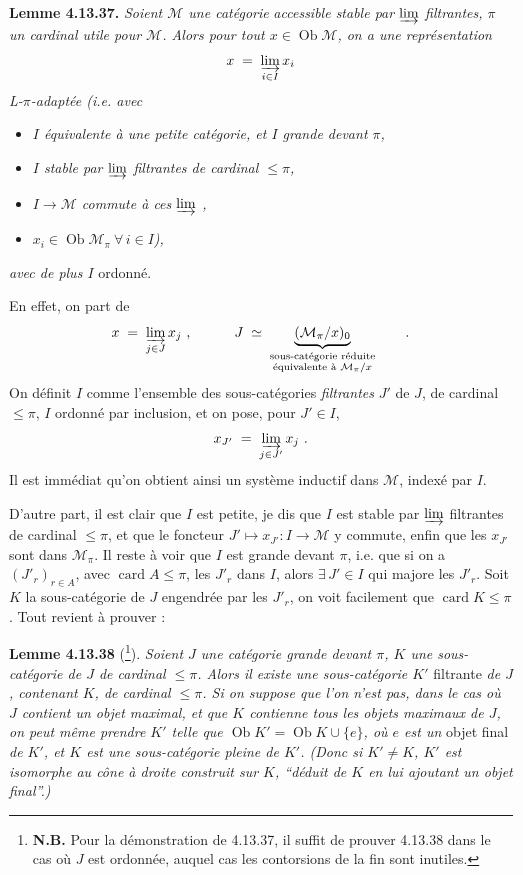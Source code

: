 \documentclass[11pt]{article}
\newcommand{\printedpage}[1]{\marginpar{\footnotesize p.~#1}}
\newcommand{\msp}[1]{\marginpar{\footnotesize [#1]}}
\newcommand{\Ob}{\operatorname{Ob}}
\newcommand{\card}{\operatorname{card}}
\newcommand{\limind}{\varinjlim}
\begin{document}
\textbf{Lemme 4.13.37.} \textit{Soient $\mathcal{M}$ une catégorie}
\msp{page 360}
\textit{accessible stable par $\limind$ filtrantes, $\pi$ un cardinal utile pour $\mathcal{M}$. Alors pour tout $x \in \Ob \mathcal{M}$, on a une représentation}
\[ x \;=\; \varinjlim_{i\in I} x_i \]
\textit{L-$\pi$-adaptée (i.e. avec}
\begin{itemize}[leftmargin=2.5em]
\item[\textit{1)}] \textit{$I$ équivalente à une petite catégorie, et $I$ grande devant $\pi$,}
\item[\textit{2)}] \textit{$I$ stable par $\limind$ filtrantes de cardinal $\leqslant \pi$,}
\item[\textit{3)}] \textit{$I \longrightarrow \mathcal{M}$ commute à ces $\limind$ ,}
\item[\textit{d)}] \textit{$x_i \in \Ob \mathcal{M}_\pi \ \forall\, i \in I$),} %
\end{itemize}
\textit{avec de plus $I$} ordonné.

En effet, on part de
\[ x \;=\; \varinjlim_{j\in J} x_j \ , \qquad\quad J \;\simeq\; \underbrace{(\mathcal{M}_\pi/x)_0}_{\substack{\text{sous-catégorie réduite}\\ \text{équivalente à } \mathcal{M}_\pi/x}} \qquad . \]
On définit $I$ comme l'ensemble des sous-catégories \textit{filtrantes} $J'$ de $J$, de cardinal $\leqslant \pi$, $I$ ordonné par inclusion, et on pose, pour $J' \in I$,
\[ x_{J'} \;=\; \varinjlim_{j\in J'} x_j \ . \]
Il est immédiat qu'on obtient ainsi un système inductif dans $\mathcal{M}$, indexé par $I$.

\msp{page 361}

D'autre part, il est clair que $I$ est petite, je dis que $I$ est stable par $\limind$ filtrantes de cardinal $\leqslant \pi$, et que le foncteur $J' \longmapsto x_{J'} : I \longrightarrow \mathcal{M}$ y commute, enfin que les $x_{J'}$ sont dans $\mathcal{M}_\pi$. Il reste à voir que $I$ est grande devant $\pi$, i.e. que si on a $(J'_r)_{r\in A}$, avec $\card A \leqslant \pi$, les $J'_r$ dans $I$, alors $\exists\, J' \in I$ qui majore les $J'_r$. Soit $K$ la sous-catégorie de $J$ engendrée par les $J'_r$, on voit facilement que $\card K \leqslant \pi$. Tout revient à prouver :

\printedpage{137}
\textbf{Lemme 4.13.38} (\footnote[160]{\textbf{N.B.} Pour la démonstration de 4.13.37, il suffit de prouver 4.13.38 dans le cas où $J$ est ordonnée, auquel cas les contorsions de la fin sont inutiles.}). \textit{Soient $J$ une catégorie grande devant $\pi$, $K$ une sous-catégorie de $J$ de cardinal $\leqslant \pi$. Alors il existe une sous-catégorie $K'$} filtrante \textit{de $J$, contenant $K$, de cardinal $\leqslant \pi$. Si on suppose que l'on n'est pas, dans le cas où $J$ contient un objet maximal, et que $K$ contienne tous les objets maximaux de $J$,}
\msp{page 362}
\textit{on peut même prendre $K'$ telle que $\Ob K' = \Ob K \cup \{e\}$, où $e$ est un} objet final \textit{de $K'$, et $K$ est une sous-catégorie pleine de $K'$. (Donc si $K' \neq K$, $K'$ est isomorphe au cône à droite construit sur $K$, “déduit de $K$ en lui ajoutant un objet final”.)}
\end{document}

